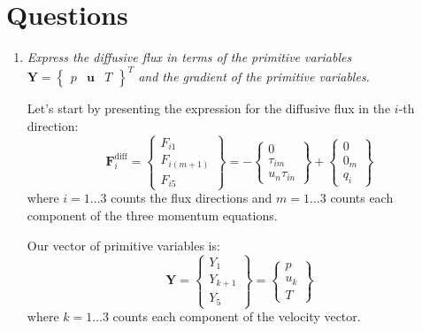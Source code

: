 \documentclass{ucb}
\begin{document}
\ucbcover

\section*{Questions}

\begin{enumerate}

\item \textit{Express the diffusive flux in terms of the primitive variables $\bm{Y} = \begin{Bmatrix}p & \bm{u} & T\end{Bmatrix}^T$ and the gradient of the primitive variables.}
\label{item1}

Let's start by presenting the expression for the diffusive flux in the $i$-th direction:
\begin{equation}
    \bm{F}_i^\mathrm{diff} = 
    \begin{Bmatrix}
        F_{i1} \\
        F_{i(m+1)} \\
        F_{i5}
    \end{Bmatrix}
    =
    -
    \begin{Bmatrix}
        0 \\
        \tau_{im} \\
        u_n\tau_{in}
    \end{Bmatrix}
    +
    \begin{Bmatrix}
        0 \\
        0_m \\
        q_i
    \end{Bmatrix}
    \label{eq:diff}
\end{equation}
where $i = 1 \ldots 3$ counts the flux directions and $m = 1 \ldots 3$ counts each component of the three momentum equations.

Our vector of primitive variables is:
\begin{equation}
    \bm{Y} =
    \begin{Bmatrix}
        Y_1 \\
        Y_{k+1} \\
        Y_5
    \end{Bmatrix}
    =
    \begin{Bmatrix}
        p \\
        u_k \\
        T
    \end{Bmatrix}
\end{equation}
where $k = 1 \ldots 3$ counts each component of the velocity vector.


\end{enumerate}
\end{document}
